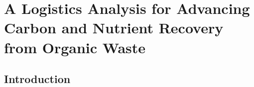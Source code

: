 \chapter{A Logistics Analysis for Advancing Carbon and Nutrient Recovery from Organic Waste}\label{ch:LogisticsAnalysis}
\section{Introduction}

